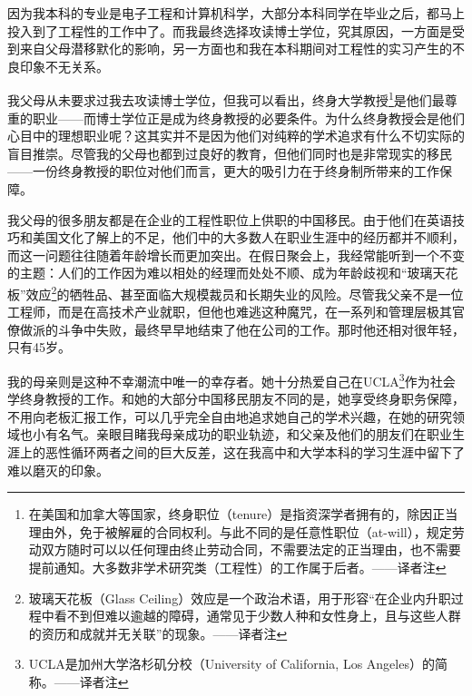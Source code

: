 \documentclass[letter,12pt]{book}
\begin{document}
\begin{CJK}{UTF8}{gbsn}


\newline

\mainmatter



因为我本科的专业是电子工程和计算机科学，大部分本科同学在毕业之后，都马上投入到了工程性的工作中了。而我最终选择攻读博士学位，究其原因，一方面是受到来自父母潜移默化的影响，另一方面也和我在本科期间对工程性的实习产生的不良印象不无关系。

我父母从未要求过我去攻读博士学位，但我可以看出，终身大学教授\footnote{在美国和加拿大等国家，终身职位（tenure）是指资深学者拥有的，除因正当理由外，免于被解雇的合同权利。与此不同的是任意性职位（at-will），规定劳动双方随时可以以任何理由终止劳动合同，不需要法定的正当理由，也不需要提前通知。大多数非学术研究类（工程性）的工作属于后者。——译者注}是他们最尊重的职业——而博士学位正是成为终身教授的必要条件。为什么终身教授会是他们心目中的理想职业呢？这其实并不是因为他们对纯粹的学术追求有什么不切实际的盲目推崇。尽管我的父母也都到过良好的教育，但他们同时也是非常现实的移民——一份终身教授的职位对他们而言，更大的吸引力在于终身制所带来的工作保障。

我父母的很多朋友都是在企业的工程性职位上供职的中国移民。由于他们在英语技巧和美国文化了解上的不足，他们中的大多数人在职业生涯中的经历都并不顺利，而这一问题往往随着年龄增长而更加突出。在假日聚会上，我经常能听到一个不变的主题：人们的工作因为难以相处的经理而处处不顺、成为年龄歧视和“玻璃天花板”效应\footnote{玻璃天花板（Glass Ceiling）效应是一个政治术语，用于形容“在企业内升职过程中看不到但难以逾越的障碍，通常见于少数人种和女性身上，且与这些人群的资历和成就并无关联”的现象。——译者注}的牺牲品、甚至面临大规模裁员和长期失业的风险。尽管我父亲不是一位工程师，而是在高技术产业就职，但他也难逃这种魔咒，在一系列和管理层极其官僚做派的斗争中失败，最终早早地结束了他在公司的工作。那时他还相对很年轻，只有45岁。

我的母亲则是这种不幸潮流中唯一的幸存者。她十分热爱自己在UCLA\footnote{UCLA是加州大学洛杉矶分校（University of California, Los Angeles）的简称。——译者注}作为社会学终身教授的工作。和她的大部分中国移民朋友不同的是，她享受终身职务保障，不用向老板汇报工作，可以几乎完全自由地追求她自己的学术兴趣，在她的研究领域也小有名气。亲眼目睹我母亲成功的职业轨迹，和父亲及他们的朋友们在职业生涯上的恶性循环两者之间的巨大反差，这在我高中和大学本科的学习生涯中留下了难以磨灭的印象。


\end{CJK}
\end{document}

